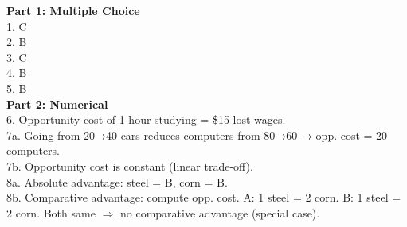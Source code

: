 \documentclass[12pt]{article}
\begin{document}
\textbf{Part 1: Multiple Choice} \\
1. C \\
2. B \\
3. C \\
4. B \\
5. B \\


\noindent \textbf{Part 2: Numerical} \\
6. Opportunity cost of 1 hour studying = \$15 lost wages. \\
7a. Going from 20→40 cars reduces computers from 80→60 → opp. cost = 20 computers. \\
7b. Opportunity cost is constant (linear trade-off). \\
8a. Absolute advantage: steel = B, corn = B. \\
8b. Comparative advantage: compute opp. cost. A: 1 steel = 2 corn. B: 1 steel = 2 corn. Both same $\Rightarrow$ no comparative advantage (special case). \\
\end{document}
